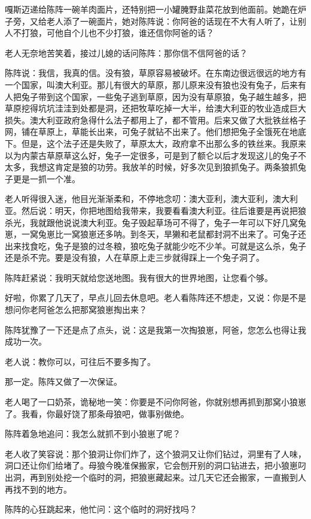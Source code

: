 \par 嘎斯迈递给陈阵一碗羊肉面片，还特别把一小罐腌野韭菜花放到他面前。她跪在炉子旁，又给老人添了一碗面片，她对陈阵说：你阿爸的话现在不大有人听了，让别人不打狼，可他自个儿也不少打狼，谁还信你阿爸的话？
\par 老人无奈地苦笑着，接过儿媳的话问陈阵：那你信不信阿爸的话？
\par 陈阵说：我信，我真的信。没有狼，草原容易被破坏。在东南边很远很远的地方有一个国家，叫澳大利亚。那儿有很大的草原，那儿原来没有狼也没有兔子，后来有人把兔子带到这个国家，一些兔子逃到草原，因为没有草原狼，兔子越生越多，把草原挖得坑坑洼洼到处都是洞，还把牧草吃掉一大半，给澳大利亚的牧业造成巨大损失。澳大利亚政府急得什么法子都用上了，都不管用。后来又做了大批铁丝格子网，铺在草原上，草能长出来，可兔子就钻不出来了。他们想把兔子全饿死在地底下。但是，这个法子还是失败了，草原太大，政府拿不出那么多的铁丝来。我原来以为内蒙古草原草这么好，兔子一定很多，可是到了额仑以后才发现这儿的兔子不太多，我想这肯定是狼的功劳。我放羊的时候，好多次见到狼抓兔子。两条狼抓兔子更是一抓一个准。
\par 老人听得很入迷，他目光渐渐柔和，不停地念叨：澳大亚利，澳大亚利，澳大利亚。然后说：明天，你把地图给我带来，我要看看澳大利亚。往后谁要是再说把狼杀光，我就跟他说说澳大利亚。兔子毁起草场可不得了，兔子一年可以下好几窝兔崽，一窝兔崽比一窝狼崽还多呐。到冬天，旱獭和老鼠都封洞不出来了。可兔子还出来找食吃，兔子是狼的过冬粮，狼吃兔子就能少吃不少羊。可就是这么杀，兔子还是杀不完。要是没有狼，人在草原上走三步就得踩上一个兔子洞了。
\par 陈阵赶紧说：我明天就给您送地图。我有很大的世界地图，让您看个够。
\par 好啦，你累了几天了，早点儿回去休息吧。老人看陈阵还不想走，又说：你是不是想问你老阿爸怎么把那窝狼崽掏出来？
\par 陈阵犹豫了一下还是点了点头，说：这是我第一次掏狼崽，阿爸，您怎么也得让我成功一次。
\par 老人说：教你可以，可往后不要多掏了。
\par 那一定。陈阵又做了一次保证。
\par 老人喝了一口奶茶，诡秘地一笑：你要是不问你阿爸，你就别想再抓到那窝小狼崽了。我看，你最好饶了那条母狼吧，做事别做绝。
\par 陈阵着急地追问：我怎么就抓不到小狼崽了呢？
\par 老人收了笑容说：那个狼洞让你们炸了，这个狼洞又让你们钻过，洞里有了人味，洞口还让你们给堵了。母狼今晚准保搬家，它会刨开别的洞口钻进去，把小狼崽叼出洞，再到别处挖一个临时的洞，把狼崽藏起来。过几天它还会搬家，一直搬到人再找不到的地方。
\par 陈阵的心狂跳起来，他忙问：这个临时的洞好找吗？
